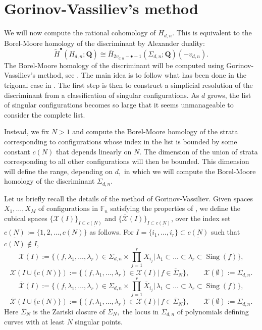 \documentclass[10pt,a4paper,twoside]{amsart}
\theoremstyle{plain}
\theoremstyle{definition}
\theoremstyle{remark}
\begin{document}
\section{Gorinov-Vassiliev's method} \label{sec-GV}
We will now compute the rational cohomology of $H_{d,n}$. This is equivalent to the Borel-Moore homology of the discriminant by Alexander duality:
\begin{equation}
\tilde{H}^\bullet(H_{d,n};\mathbf{Q})\cong\bar{H}_{2v_{d,n}-\bullet-1}(\Sigma_{d,n};\mathbf{Q})(-v_{d,n}).
\end{equation}
The Borel-Moore homology of the discriminant will be computed using Gorinov-Vassiliev's method, see \cite{TomM4}.
The main idea is to follow what has been done in the trigonal case in \cite[Section 3]{Zhe}. 
The first step is then to construct a simplicial resolution of the discriminant from a classification of singular configurations. As $d$ grows, the list of singular configurations becomes so large that it seems unmanageable to consider the complete list. 

Instead, we fix $N>1$ and compute the Borel-Moore homology of the 
strata corresponding to configurations whose index in the list is bounded by some constant {$c(N)$} that depends linearly on $N$.  
The dimension of the union of strata corresponding to all other configurations will then be bounded. 
This dimension will define the range, depending on $d,$ in which we will compute the Borel-Moore homology of the discriminant $\Sigma_{d,n}$.

Let us briefly recall the details of the method of Gorinov-Vassiliev. Given spaces $X_1,\dots,X_M$ of configurations in $\mathbb{F}_n$ satisfying the properties of \cite[List 2.3]{TomM4}, we define the cubical spaces 
$\{\mathcal{X}(I)\}_{I\subset\underline{c(N)}}$ and 
$\{\overline{\mathcal{X}}(I)\}_{I\subset\underline{c(N)}}$, over the index set 
{$\underline{c(N)}:=\{1,2,\ldots,c(N)\}$} as follows.
For
$I=\{i_1,\dots,i_r\}\subset\underline{c(N)}$ such that 
$c(N)\notin I,$
$$\mathcal{X}(I):=\{(f,\lambda_{1},\dots,\lambda_{r})\in\Sigma_{d,n}\times\prod^r_{j=1}X_{i_j}|\,\lambda_1\subset\dots\subset\lambda_r\subset\operatorname{Sing}(f)\},$$
$$\mathcal{X}({I\cup \{{c(N)}\}}):=\{(f,\lambda_{1},\dots,\lambda_{r})\in \mathcal{X}(I)|\, f\in \overline{\Sigma}_N\},\qquad \mathcal{X}(\emptyset):=\Sigma_{d,n}.$$
$$\overline{\mathcal{X}}(I):=\{(f,\lambda_{1},\dots,\lambda_{r})\in\Sigma_{d,n}\times\prod^r_{j=1}\overline{X}_{i_j}|\,\lambda_1\subset\dots\subset\lambda_r\subset\operatorname{Sing}(f)\},$$
$$\overline{\mathcal{X}}({I\cup \{{c(N)}\}}):=\{(f,\lambda_{1},\dots,\lambda_{r})\in \overline{\mathcal{X}}(I)|\, f\in \overline{\Sigma}_N\},\qquad \mathcal{X}(\emptyset):=\Sigma_{d,n}.$$
Here $\overline{\Sigma}_{N}$ is the Zariski closure of $\Sigma_N,$ the locus in $\Sigma_{d,n}$ of polynomials defining curves with at least $N$ singular points.
\end{document}
